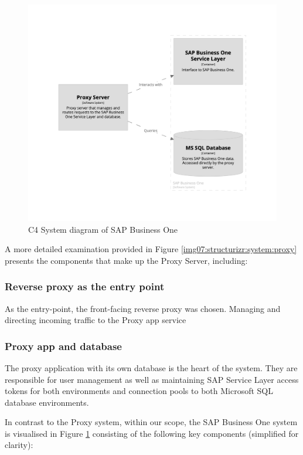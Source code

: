 \begin{figure}[p]\centering
\includegraphics[width=140mm]{img/chap07/fig_structurizr-sap-system.png}
\caption{C4 System diagram of SAP Business One}
\label{img07:structurizr:system:sap}
\end{figure}

A more detailed examination provided in Figure \ref{img07:structurizr:system:proxy} presents the components that make up the Proxy Server, including:

\subsubsection{Reverse proxy as the entry point}
As the entry-point, the front-facing reverse proxy was chosen.
Managing and directing incoming traffic to the Proxy app service

\subsubsection{Proxy app and database}
The proxy application with its own database is the heart of the system.
They are responsible for user management as well as maintaining SAP Service Layer access tokens for both environments and connection pools to both Microsoft SQL database environments.

In contrast to the Proxy system, within our scope, the SAP Business One system is visualised in Figure \ref{img07:structurizr:system:sap} consisting of the following key components (simplified for clarity):
 
